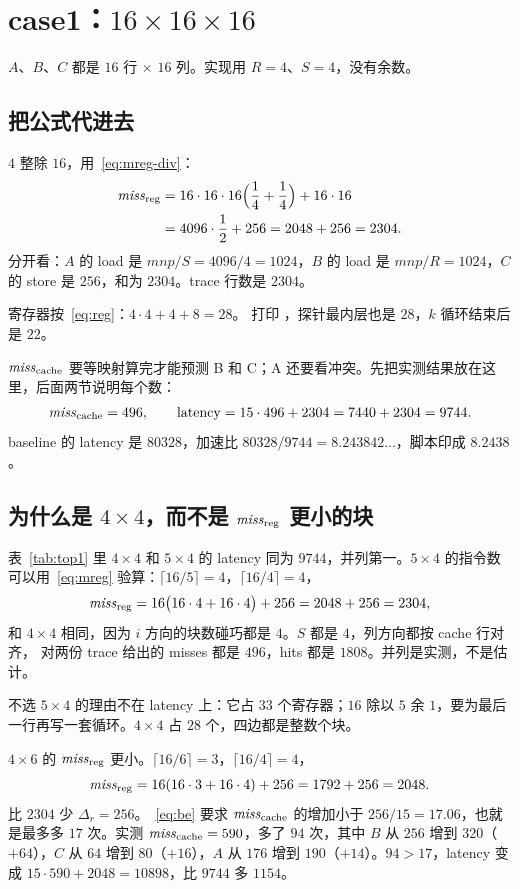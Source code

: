 \section{case1：\texorpdfstring{$16\times 16\times 16$}{16x16x16}}
\label{sec:c1}

$A$、$B$、$C$ 都是 $16$ 行 $\times$ $16$ 列。实现用 $R=4$、$S=4$，没有余数。

\subsection{把公式代进去}

$4$ 整除 $16$，用~\eqref{eq:mreg-div}：
\begin{align*}
\mathit{miss}_{\mathrm{reg}}
&=16\cdot16\cdot16\Bigl(\frac14+\frac14\Bigr)+16\cdot16\\
&=4096\cdot\frac12+256
=2048+256
=2304.
\end{align*}
分开看：$A$ 的 load 是 $mnp/S=4096/4=1024$，$B$ 的 load 是 $mnp/R=1024$，$C$ 的 store 是 $256$，和为 $2304$。trace 行数是 $2304$。

寄存器按~\eqref{eq:reg}：$4\cdot4+4+8=28$。 打印 ，探针最内层也是 $28$，$k$ 循环结束后是 $22$。

$\mathit{miss}_{\mathrm{cache}}$ 要等映射算完才能预测 B 和 C；A 还要看冲突。先把实测结果放在这里，后面两节说明每个数：
\[
\mathit{miss}_{\mathrm{cache}}=496,\qquad \mathrm{latency}=15\cdot496+2304=7440+2304=9744.
\]
baseline 的 latency 是 $80328$，加速比 $80328/9744=8.243842\ldots$，脚本印成 $8.2438$。

\subsection{为什么是 \texorpdfstring{$4\times4$}{4x4}，而不是 \texorpdfstring{$\mathit{miss}_{\mathrm{reg}}$}{miss\_reg} 更小的块}

表~\ref{tab:top1} 里 $4\times4$ 和 $5\times4$ 的 latency 同为 $9744$，并列第一。$5\times4$ 的指令数可以用~\eqref{eq:mreg} 验算：$\lceil16/5\rceil=4$，$\lceil16/4\rceil=4$，
\[
\mathit{miss}_{\mathrm{reg}}=16\bigl(16\cdot4+16\cdot4\bigr)+256=2048+256=2304,
\]
和 $4\times4$ 相同，因为 $i$ 方向的块数碰巧都是 $4$。$S$ 都是 $4$，列方向都按 cache 行对齐， 对两份 trace 给出的 misses 都是 $496$，hits 都是 $1808$。并列是实测，不是估计。

不选 $5\times4$ 的理由不在 latency 上：它占 $33$ 个寄存器；$16$ 除以 $5$ 余 $1$，要为最后一行再写一套循环。$4\times4$ 占 $28$ 个，四边都是整数个块。

$4\times6$ 的 $\mathit{miss}_{\mathrm{reg}}$ 更小。$\lceil16/6\rceil=3$，$\lceil16/4\rceil=4$，
\[
\mathit{miss}_{\mathrm{reg}}=16(16\cdot3+16\cdot4)+256=1792+256=2048.
\]
比 $2304$ 少 $\Delta_r=256$。~\eqref{eq:be} 要求 $\mathit{miss}_{\mathrm{cache}}$ 的增加小于 $256/15=17.06$，也就是最多多 $17$ 次。实测 $\mathit{miss}_{\mathrm{cache}}=590$，多了 $94$ 次，其中 $B$ 从 $256$ 增到 $320$（$+64$），$C$ 从 $64$ 增到 $80$（$+16$），$A$ 从 $176$ 增到 $190$（$+14$）。$94>17$，latency 变成 $15\cdot590+2048=10898$，比 $9744$ 多 $1154$。

